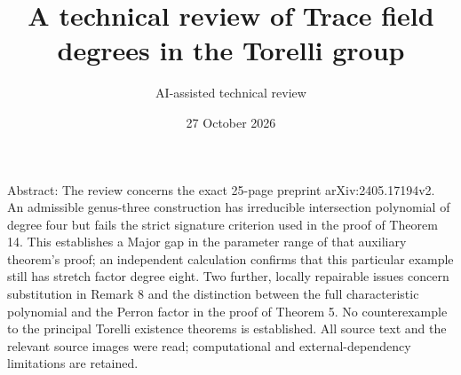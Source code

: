 \documentclass[10pt]{article}
\title{A technical review of
Trace field degrees in the Torelli group}
\author{AI-assisted technical review}
\date{27 October 2026}
\begin{document}
\maketitle
Abstract: The review concerns the exact 25-page preprint arXiv:2405.17194v2. An admissible genus-three construction has irreducible intersection polynomial of degree four but fails the strict signature criterion used in the proof of Theorem 14. This establishes a Major gap in the parameter range of that auxiliary theorem’s proof; an independent calculation confirms that this particular example still has stretch factor degree eight. Two further, locally repairable issues concern substitution in Remark 8 and the distinction between the full characteristic polynomial and the Perron factor in the proof of Theorem 5. No counterexample to the principal Torelli existence theorems is established. All source text and the relevant source images were read; computational and external-dependency limitations are retained.\par
\end{document}
